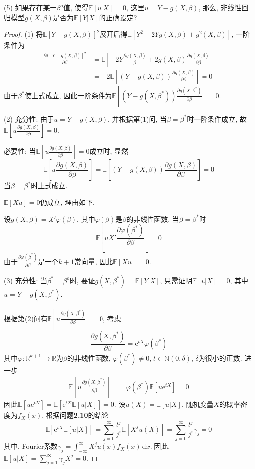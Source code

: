 \documentclass[cn,12pt,math=mtpro2,citestyle=gb7714-2015,bibstyle=gb7714-2015,twocol,mode=simple]{elegantbook}
\newcommand{\E}{\mathbb{E}}
\begin{document}
(5) 如果存在某一$\beta^o$值, 使得$\E[u|X]=0$, 这里$u=Y-g(X,\beta)$, 那么, 非线性回归模型$g(X,\beta)$是否为$\E[Y|X]$的正确设定?

\begin{proof}
  (1) 将$\E[Y-g(X,\beta)]^2$展开后得$\E[Y^2-2Yg(X,\beta)+g^2(X,\beta)]$, 一阶条件为
  \begin{align}
  \frac{\partial \E[Y-g(X,\beta)]^2}{\partial \beta}&=\E\left[-2Y\frac{\partial g(X,\beta)}{\beta}+2g(X,\beta)\frac{\partial g(X,\beta)}{\partial \beta}\right] \nonumber \\
  &=-2\E\left[(Y-g(X,\beta))\frac{\partial g(X,\beta)}{\partial \beta}\right]=0 \nonumber
  \end{align}
  由于$\beta^{\ast}$使上式成立, 因此一阶条件为$\displaystyle \E\left[(Y-g(X,\beta^{\ast}))\frac{\partial g(X,\beta^\ast)}{\partial \beta}\right]=0$.

  (2) 充分性: 由于$u=Y-g(X,\beta)$, 并根据第(1)问, 当$\beta=\beta^{\ast}$时一阶条件成立, 故$\displaystyle \E\left[u\frac{\partial g(X,\beta)}{\partial \beta}\right]=0$.

  必要性: 当$\displaystyle \E\left[u\frac{\partial g(X,\beta)}{\partial \beta}\right]=0$成立时, 显然
  $$\E\left[u\frac{\partial g(X,\beta)}{\partial \beta}\right]=\E\left[(Y-g(X,\beta))\frac{\partial g(X,\beta)}{\partial \beta}\right]=0$$
  当$\beta=\beta^{\ast}$时上式成立.

  $\E[Xu]=0$仍成立, 理由如下.

  设$g(X,\beta)=X' \varphi(\beta)$, 其中$\varphi(\beta)$是$\beta$的非线性函数. 当$\beta=\beta^{\ast}$时
  $$\E\left[uX'\frac{\partial \varphi(\beta^\ast)}{\partial\beta}\right]=0 $$
  由于$\displaystyle \frac{\partial \varphi(\beta^\ast)}{\partial\beta}$是一个$k+1$常向量, 因此$\E[Xu]=0$.

  (3) 充分性: 当$\beta^{\ast}=\beta^o$时, 要证$g(X,\beta^{\ast})=\E[Y|X]$, 只需证明$\E[u|X]=0$, 其中$u=Y-g(X,\beta^{\ast})$.

  根据第(2)问有$\displaystyle\E\left[u\frac{\partial g(X,\beta^\ast)}{\partial \beta}\right]=0$, 考虑
  $$\frac{\partial g(X,\beta^\ast)}{\partial \beta}=\text{e}^{tX}\varphi(\beta^{\ast})$$
  其中$\varphi: \mathbb{R}^{k+1}\rightarrow\mathbb{R}$为$\beta$的非线性函数, $\varphi(\beta^{\ast})\neq0$, $t \in \mathbb{N}(0,\delta)$, $\delta$为很小的正数. 进一步
  \begin{align}
  \E\left[u\frac{\partial g(X,\beta^{\ast})}{\partial \beta}\right]&=\varphi(\beta^{\ast})\E[u\text{e}^{tX}]=0 \nonumber
  \end{align}
  因此$\E[u\text{e}^{tX}]=\E[\text{e}^{tX}\E[u|X]]=0$. 设$u(X)=\E[u|X]$, 随机变量$X$的概率密度为$f_X(x)$, 根据问题\textbf{2.10}的结论
  $$\E[\text{e}^{tX}\E[u|X]]=\sum_{j=0}^{\infty}\frac{t^j}{j!}\E[X^ju(X)]=\sum_{j=0}^{\infty}\frac{t^j}{j!}\gamma_j=0$$
  其中, Fourier系数$\displaystyle\gamma_j=\int_{-\infty}^{\infty}X^ju(x)f_X(x)\,\text{d}x$. 因此, $\displaystyle\E[u|X]=\sum_{j=1}^{\infty}\gamma_jX^j=0$.


\end{proof}
\end{document}
